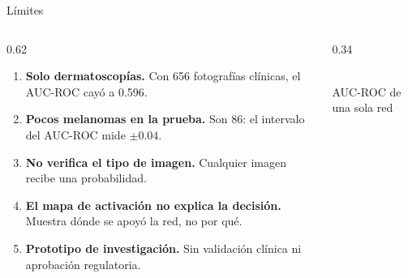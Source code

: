 \documentclass[aspectratio=169,10pt]{beamer}
\newcommand{\nota}[1]{{\footnotesize\color{black!65}#1}}
\begin{document}
\begin{frame}{Límites}
  \begin{columns}[c]
    \begin{column}{0.62\textwidth}
      \begin{enumerate}
        \item \textbf{Solo dermatoscopías.} Con 656 fotografías clínicas, el AUC-ROC cayó a 0.596.
        \item \textbf{Pocos melanomas en la prueba.} Son 86: el intervalo del AUC-ROC mide $\pm 0.04$.
        \item \textbf{No verifica el tipo de imagen.} Cualquier imagen recibe una probabilidad.
        \item \textbf{El mapa de activación no explica la decisión.} Muestra dónde se apoyó la red, no por qué.
        \item \textbf{Prototipo de investigación.} Sin validación clínica ni aprobación regulatoria.
      \end{enumerate}
    \end{column}
    \begin{column}{0.34\textwidth}
      \centering
      \\[0.3em]
      \nota{AUC-ROC de una sola red}
    \end{column}
  \end{columns}
\end{frame}
\end{document}
